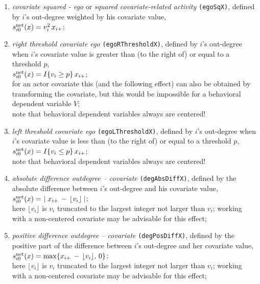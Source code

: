 \documentclass[a4paper,fleqn,11pt]{article}
\newcommand{\+}{\, + \,}
\newcommand{\vit}{\theenumi}
\begin{document}
\begin{enumerate}
 \item {\em covariate squared - ego} or {\em squared covariate-related activity}
 \texttt{(egoSqX)},
 defined by $i$'s out-degree weighted by his covariate value,\\
 $s^{\rm net}_{i\vit}(x) = v_i^2 \, x_{i+} $;

 \item {\em right threshold covariate ego}
 \texttt{(egoRThresholdX)},
 defined by $i$'s out-degree when $i$'s covariate value
 is greater than (to the right of)  or equal to a threshold $p$,\\
 $s^{\rm net}_{i\vit}(x) = I\{v_i \geq p\} \, x_{i+} $;\\
 for an actor covariate this (and the following effect)
 can also be obtained by transforming
 the covariate, but this would be impossible for a behavioral dependent
 variable $V$;\\
 note that behavioral dependent variables always are centered!

 \item {\em left threshold covariate ego}
 \texttt{(egoLThresholdX)},
 defined by $i$'s out-degree when $i$'s covariate value
 is less than (to the right of) or equal to a threshold $p$,\\
 $s^{\rm net}_{i\vit}(x) = I\{v_i \leq p\} \, x_{i+} $;\\
 note that behavioral dependent variables always are centered!

 \item {\em absolute difference outdegree -- covariate}
 \texttt{(degAbsDiffX)},
 defined by the absolute difference between $i$'s out-degree and his covariate value,\\
 $s^{\rm net}_{i\vit}(x) = \ \mid x_{i+} \,-\, \lfloor v_i \rfloor \mid $;\\
 here $\lfloor v_i \rfloor $ is $v_i$ truncated to the largest integer
 not larger than $v_i$;
 working with a non-centered covariate may be advisable for this effect;

 \item {\em positive difference outdegree -- covariate}
 \texttt{(degPosDiffX)},
 defined by the positive part of the difference between $i$'s out-degree
 and her covariate value,\\
 $s^{\rm net}_{i\vit}(x) = \max \{ x_{i+} \,-\, \lfloor v_i \rfloor  ,\, 0 \} $;\\
 here $\lfloor v_i \rfloor $ is $v_i$ truncated to the largest integer
 not larger than $v_i$;
 working with a non-centered covariate may be advisable for this effect;


\end{enumerate}
\end{document}
